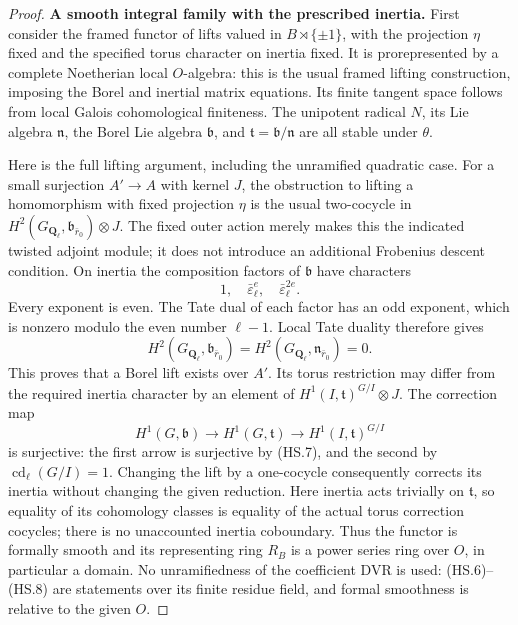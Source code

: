 \documentclass[11pt,a4paper]{article}
\theoremstyle{definition}
\renewcommand{\paragraph}[1]{\par\smallskip\noindent\textbf{#1}\quad\ignorespaces}
\begin{document}
\begin{proof}
\paragraph{A smooth integral family with the prescribed inertia.}
First consider the framed functor of lifts valued in
$B\rtimes\{\pm1\}$, with the projection $\eta$ fixed and the
specified torus character on inertia fixed.  It is prorepresented
by a complete Noetherian local $O$-algebra: this is the usual
framed lifting construction, imposing the Borel and inertial
matrix equations.  Its finite tangent space follows from local
Galois cohomological finiteness.  The unipotent radical $N$,
its Lie algebra $\mathfrak n$, the Borel Lie algebra
$\mathfrak b$, and $\mathfrak t=\mathfrak b/\mathfrak n$
are all stable under $\theta$.

Here is the full lifting argument, including the unramified
quadratic case.  For a small surjection $A'\to A$ with kernel
$J$, the obstruction to lifting a homomorphism with fixed
projection $\eta$ is the usual two-cocycle in
$H^2(G_{\mathbf Q_\ell},\mathfrak b_{\bar r_0})\otimes J$.
The fixed outer action merely makes this the indicated twisted
adjoint module; it does not introduce an additional Frobenius
descent condition.  On inertia the composition factors of
$\mathfrak b$ have characters
\[
                   1,\quad\bar\varepsilon_\ell^e,
                         \quad\bar\varepsilon_\ell^{2e}.
                                                               \tag{HS.6}
\]
Every exponent is even.  The Tate dual of each factor has an
odd exponent, which is nonzero modulo the even number
$\ell-1$.  Local Tate duality therefore gives
\[
 H^2(G_{\mathbf Q_\ell},\mathfrak b_{\bar r_0})
   =H^2(G_{\mathbf Q_\ell},\mathfrak n_{\bar r_0})=0.
                                                               \tag{HS.7}
\]
This proves that a Borel lift exists over $A'$.  Its torus
restriction may differ from the required inertia character by
an element of $H^1(I,\mathfrak t)^{G/I}\otimes J$.
The correction map
\[
 H^1(G,\mathfrak b)\longrightarrow
 H^1(G,\mathfrak t)\longrightarrow
 H^1(I,\mathfrak t)^{G/I}                                  \tag{HS.8}
\]
is surjective: the first arrow is surjective by (HS.7), and
the second by $\operatorname{cd}_\ell(G/I)=1$.
Changing the lift by a one-cocycle consequently corrects its
inertia without changing the given reduction.  Here inertia acts
trivially on $\mathfrak t$, so equality of its cohomology classes
is equality of the actual torus correction cocycles; there is
no unaccounted inertia coboundary.  Thus the functor
is formally smooth and its representing ring $R_B$ is a power
series ring over $O$, in particular a domain.  No unramifiedness
of the coefficient DVR is used: (HS.6)--(HS.8) are statements
over its finite residue field, and formal smoothness is relative
to the given $O$.


\end{proof}
\end{document}

